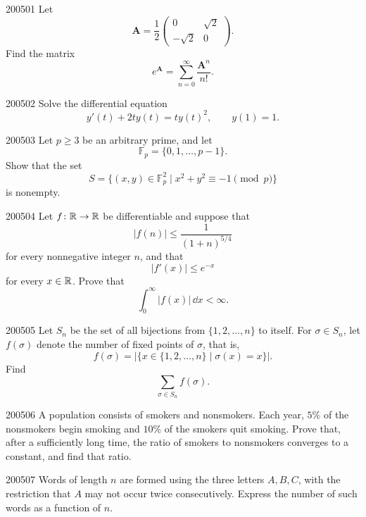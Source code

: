 
\begin{problem}{2005}{0}{1}
Let
\[
    \mathbf A=\frac12
    \begin{pmatrix}
        0 & \sqrt2\\
        -\sqrt2 & 0
    \end{pmatrix}.
\]
Find the matrix
\[
    e^{\mathbf A}=\sum_{n=0}^{\infty}\frac{\mathbf A^n}{n!}.
\]
\end{problem}

\begin{problem}{2005}{0}{2}
Solve the differential equation
\[
    y'(t)+2t y(t)=t y(t)^2,
    \qquad
    y(1)=1.
\]
\end{problem}

\begin{problem}{2005}{0}{3}
Let $p\ge3$ be an arbitrary prime, and let
\[
    \mathbb F_p=\{0, 1, \dots, p-1\}.
\]
Show that the set
\[
    S=\{(x, y)\in\mathbb F_p^2\mid x^2+y^2\equiv-1\pmod p\}
\]
is nonempty.
\end{problem}

\begin{problem}{2005}{0}{4}
Let $f\colon\mathbb{R}\to\mathbb{R}$ be differentiable and suppose that
\[
    |f(n)|\le\frac1{(1+n)^{5/4}}
\]
for every nonnegative integer $n$, and that
\[
    |f'(x)|\le e^{-x}
\]
for every $x\in\mathbb{R}$. Prove that
\[
    \int_0^{\infty}|f(x)|\, \dd x<\infty.
\]
\end{problem}

\begin{problem}{2005}{0}{5}
Let $S_n$ be the set of all bijections from $\{1, 2, \dots, n\}$ to itself. For $\sigma\in S_n$, let $f(\sigma)$ denote the number of fixed points of $\sigma$, that is,
\[
    f(\sigma)=|\{x\in\{1, 2, \dots, n\}\mid \sigma(x)=x\}|.
\]
Find
\[
    \sum_{\sigma\in S_n} f(\sigma).
\]
\end{problem}

\begin{problem}{2005}{0}{6}
A population consists of smokers and nonsmokers. Each year, $5\%$ of the nonsmokers begin smoking and $10\%$ of the smokers quit smoking. Prove that, after a sufficiently long time, the ratio of smokers to nonsmokers converges to a constant, and find that ratio.
\end{problem}

\begin{problem}{2005}{0}{7}
Words of length $n$ are formed using the three letters $A, B, C$, with the restriction that $A$ may not occur twice consecutively. Express the number of such words as a function of $n$.
\end{problem}

